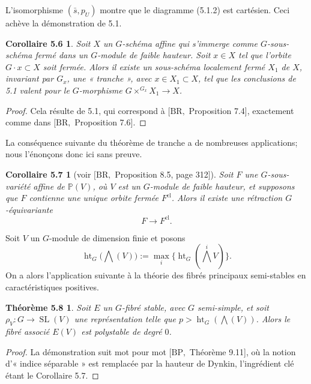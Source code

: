 \documentclass[11pt]{article}
\newcommand{\htG}{\operatorname{ht}_G}
\newcommand{\SL}{\operatorname{SL}}
\newtheorem*{corollaire56}{Corollaire 5.6}
\newtheorem*{corollaire57}{Corollaire 5.7}
\newtheorem*{theoreme58}{Théorème 5.8}
\begin{document}
L'isomorphisme \((\bar s,p_U)\) montre que le diagramme (5.1.2) est cartésien. Ceci
achève la démonstration de 5.1.

\begin{corollaire56}
Soit \(X\) un \(G\)-schéma affine qui s'immerge comme \(G\)-sous-schéma fermé dans un
\(G\)-module de faible hauteur. Soit \(x\in X\) tel que l'orbite
\(G\cdot x\subset X\) soit fermée. Alors il existe un sous-schéma localement fermé
\(X_1\) de \(X\), invariant par \(G_x\), une « tranche », avec \(x\in X_1\subset X\),
tel que les conclusions de 5.1 valent pour le \(G\)-morphisme
\(G\times^{G_x}X_1\to X\).
\end{corollaire56}

\begin{proof}
Cela résulte de 5.1, qui correspond à \([\mathrm{BR},\) Proposition 7.4], exactement comme
dans \([\mathrm{BR},\) Proposition 7.6].
\end{proof}

La conséquence suivante du théorème de tranche a de nombreuses applications; nous
l'énonçons donc ici sans preuve.

\begin{corollaire57}[{voir \([\mathrm{BR},\) Proposition 8.5, page 312]}]
Soit \(F\) une \(G\)-sous-variété affine de \(\mathbb P(V)\), où \(V\) est un
\(G\)-module de faible hauteur, et supposons que \(F\) contienne une unique orbite fermée
\(F^{\mathrm{cl}}\). Alors il existe une rétraction \(G\)-équivariante
\[
  F\longrightarrow F^{\mathrm{cl}}.
\]
\end{corollaire57}

Soit \(V\) un \(G\)-module de dimension finie et posons
\begin{equation}
  \htG\bigl(\bigwedge(V)\bigr):=\max_i\{\htG(\bigwedge^i V)\}.
  \tag{5.7.1}
\end{equation}
On a alors l'application suivante à la théorie des fibrés principaux semi-stables en
caractéristiques positives.

\begin{theoreme58}
Soit \(E\) un \(G\)-fibré stable, avec \(G\) semi-simple, et soit
\(\rho_V:G\to\SL(V)\) une représentation telle que \(p>\htG(\bigwedge(V))\). Alors le
fibré associé \(E(V)\) est polystable de degré \(0\).
\end{theoreme58}

\begin{proof}
La démonstration suit mot pour mot \([\mathrm{BP},\) Théorème 9.11], où la notion
d'« indice séparable » est remplacée par la hauteur de Dynkin, l'ingrédient clé étant le
Corollaire 5.7.
\end{proof}
\end{document}
